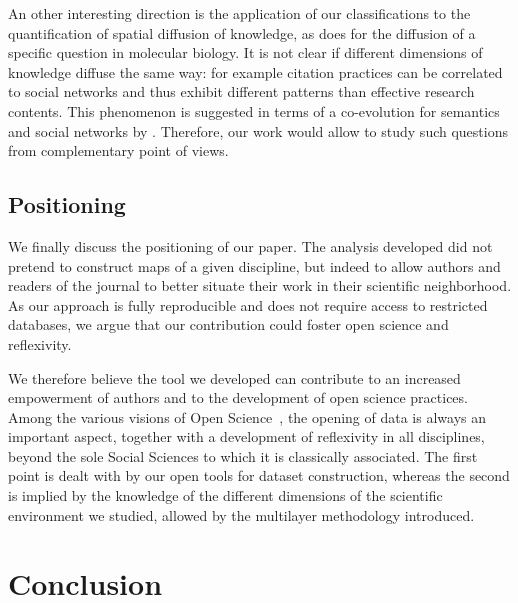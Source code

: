 An other interesting direction is the application of our classifications to the quantification of spatial diffusion of knowledge, as \cite{maisonobe2013diffusion} does for the diffusion of a specific question in molecular biology. It is not clear if different dimensions of knowledge diffuse the same way: for example citation practices can be correlated to social networks and thus exhibit different patterns than effective research contents. This phenomenon is suggested in terms of a co-evolution for semantics and social networks by \cite{roth2010social}. Therefore, our work would allow to study such questions from complementary point of views.



\subsection*{Positioning}

We finally discuss the positioning of our paper. The analysis developed did not pretend to construct maps of a given discipline, but indeed to allow authors and readers of the journal to better situate their work in their scientific neighborhood. As our approach is fully reproducible and does not require access to restricted databases, we argue that our contribution could foster open science and reflexivity.

We therefore believe the tool we developed can contribute to an increased empowerment of authors and to the development of open science practices. Among the various visions of Open Science~\citep{fecher2014open}, the opening of data is always an important aspect, together with a development of reflexivity in all disciplines, beyond the sole Social Sciences to which it is classically associated. The first point is dealt with by our open tools for dataset construction, whereas the second is implied by the  knowledge of the different dimensions of the scientific environment we studied, allowed by the multilayer methodology introduced. 





\section*{Conclusion}
\label{sec:discussion}


